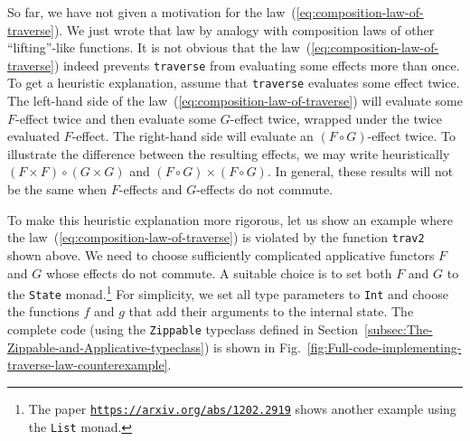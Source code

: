 So far, we have not given a motivation for the law~(\ref{eq:composition-law-of-traverse}).
We just wrote that law by analogy with composition laws of other \textsf{``}lifting\textsf{''}-like
functions. It is not obvious that the law~(\ref{eq:composition-law-of-traverse})
indeed prevents \lstinline!traverse! from evaluating some effects
more than once. To get a heuristic explanation, assume that \lstinline!traverse!
evaluates some effect twice. The left-hand side of the law~(\ref{eq:composition-law-of-traverse})
will evaluate some $F$-effect twice and then evaluate some $G$-effect
twice, wrapped under the twice evaluated $F$-effect. The right-hand
side will evaluate an $(F\circ G)$-effect twice. To illustrate the
difference between the resulting effects, we may write heuristically
$(F\times F)\circ(G\times G)$ and $(F\circ G)\times(F\circ G)$.
In general, these results will not be the same when $F$-effects and
$G$-effects do not commute.

To make this heuristic explanation more rigorous, let us show an example
where the law~(\ref{eq:composition-law-of-traverse}) is violated
by the function \lstinline!trav2! shown above. We need to choose
sufficiently complicated applicative functors $F$ and $G$ whose
effects do not commute. A suitable choice is to set both $F$ and
$G$ to the \lstinline!State! monad.\footnote{The paper \texttt{\href{https://arxiv.org/abs/1202.2919}{https://arxiv.org/abs/1202.2919}}
shows another example using the \lstinline!List! monad.} For simplicity, we set all type parameters to \lstinline!Int! and
choose the functions $f$ and $g$ that add their arguments to the
internal state. The complete code (using the \lstinline!Zippable!
typeclass defined in Section~\ref{subsec:The-Zippable-and-Applicative-typeclass})
is shown in Fig.~\ref{fig:Full-code-implementing-traverse-law-counterexample}.

